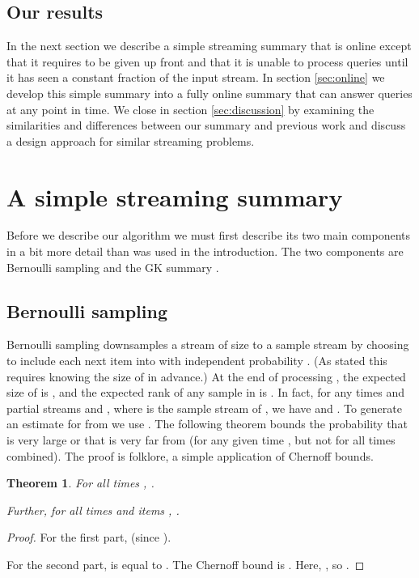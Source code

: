 \documentclass{article}
\theoremstyle{plain}
\newtheorem{theorem}{Theorem}[section]
\begin{document}
\subsection{Our results}

In the next section we describe a simple 
streaming summary that is online except that it requires  to be given up
front and that it is unable to process queries until it has seen a constant
fraction of the input stream. In section \ref{sec:online} we develop this simple
summary into a fully online summary that can answer queries at any point in
time. We close in section \ref{sec:discussion} by examining the similarities and
differences between our summary and previous work and discuss a design approach
for similar streaming problems.
 
\section{A simple streaming summary}
\label{sec:simple}

Before we describe our algorithm we must first describe its two main components
in a bit more detail than was used in the introduction. The two components are
Bernoulli sampling and the GK summary \cite{GK2001}.



\subsection{Bernoulli sampling}

Bernoulli sampling downsamples a stream  of size  to a sample stream 
by choosing to include each next item into  with independent probability
. (As stated this requires knowing the size of  in advance.) At the end
of processing , the expected size of  is , and the expected rank of any
sample  in  is .
In fact, for any times  and partial streams  and , where
 is the sample stream of , we have  and
. To generate an estimate for
 from  we use .
The following theorem bounds the probability that  is very large or that
 is very far from  (for any given time , but not for all times  combined). The proof is
folklore, a simple application of Chernoff bounds.

\begin{theorem}
  \label{thm:bernoulli}
  For all times , .

  Further, for all times  and items , .
\end{theorem}
\begin{proof}
  For the first part,  (since ).

  For the second part,  is
  equal to . The
  Chernoff bound is . Here, , so .
\end{proof}
\end{document}
